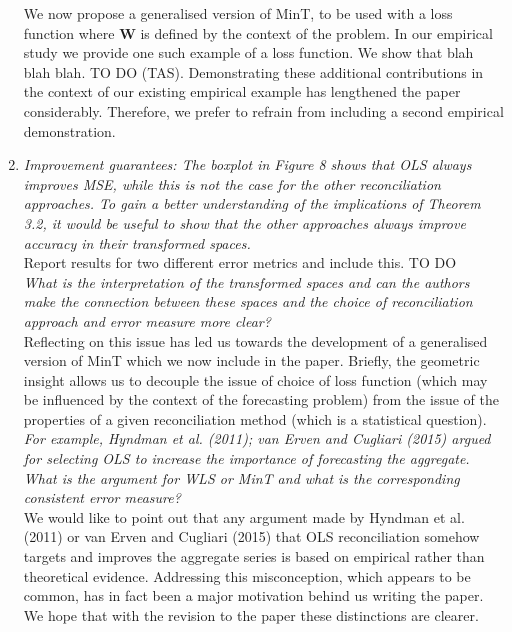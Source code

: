 \documentclass[a4paper,11pt]{article}
\begin{document}
\begin{enumerate}
		We now propose a generalised version of MinT, to be used with a loss function where $\bm{W}$ is defined by the context of the problem.  In our empirical study we provide one such example of a loss function.  We show that blah blah blah. TO DO (TAS).  Demonstrating these additional contributions in the context of our existing empirical example has lengthened the paper considerably.  Therefore, we prefer to refrain from including a second empirical demonstration.\\
		
		\item \textit{Improvement guarantees: The boxplot in Figure 8 shows that OLS always improves MSE, while this is not the case for the other reconciliation approaches. To gain a better understanding of the implications of Theorem 3.2, it would be useful to show that the other approaches always
		improve accuracy in their transformed spaces.}\\
	
	    Report results for two different error metrics and include this. TO DO\\ 
		
		\textit{What is the interpretation of the transformed spaces and can the authors make the connection	between these spaces and the choice of reconciliation approach and error measure more clear?}\\ 
	
	    Reflecting on this issue has led us towards the development of a generalised version of MinT which we now include in the paper.  Briefly, the geometric insight allows us to decouple the issue of choice of loss function (which may be influenced by the context of the forecasting problem) from the issue of the properties of a given reconciliation method (which is a statistical question).\\
		
		\textit{For example, Hyndman et al. (2011); van Erven and
		Cugliari (2015) argued for selecting OLS to increase the importance of
		forecasting the aggregate. What is the argument for WLS or MinT and
		what is the corresponding consistent error measure?}\\
	    
	    We would like to point out that any argument made by Hyndman et al. (2011) or van Erven and Cugliari (2015) that OLS reconciliation somehow targets and improves the aggregate series is based on empirical rather than theoretical evidence.  Addressing this misconception, which appears to be common, has in fact been a major motivation behind us writing the paper.  We hope that with the revision to the paper these distinctions are clearer.\\
	    
	    \end{enumerate}
	    
\end{document}
